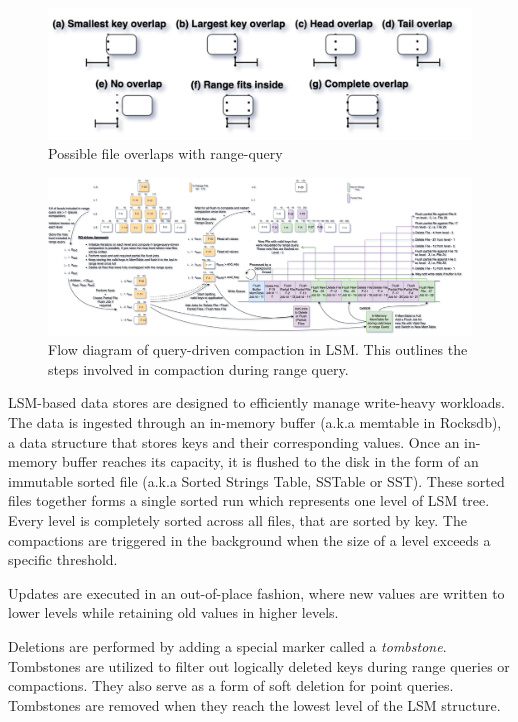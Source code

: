 \begin{figure}
    \includegraphics[scale=0.2]{Figures/File range overlaps.png}
    \caption{Possible file overlaps with range-query}\label{fig:file_range_overlaps}
\end{figure}

\begin{figure}
    \includegraphics[scale=0.10]{Figures/RQ-driven numeric key sorting.png}
    \caption{Flow diagram of query-driven compaction in LSM. This outlines the steps involved in compaction during range query.}\label{fig:query-driven_compaction}
\end{figure}

LSM-based data stores are designed to efficiently manage write-heavy workloads. The data is ingested through 
an in-memory buffer (a.k.a memtable in Rocksdb), a data structure that stores keys and their corresponding values. 
Once an in-memory buffer reaches its capacity, it is flushed to the disk in the form of an immutable sorted file (a.k.a Sorted Strings Table, SSTable or SST). 
These sorted files together forms a single sorted run which represents one level of LSM tree. Every level is completely sorted 
across all files, that are sorted by key. The compactions are triggered in the background when the size of a level exceeds a 
specific threshold.

 Updates are executed in an out-of-place fashion, where new values are written to lower levels 
while retaining old values in higher levels.

 Deletions are performed by adding a special marker called a \textit{tombstone}. Tombstones are 
utilized to filter out logically deleted keys during range queries or compactions. They also serve as a form of soft 
deletion for point queries. Tombstones are removed when they reach the lowest level of the LSM structure.

